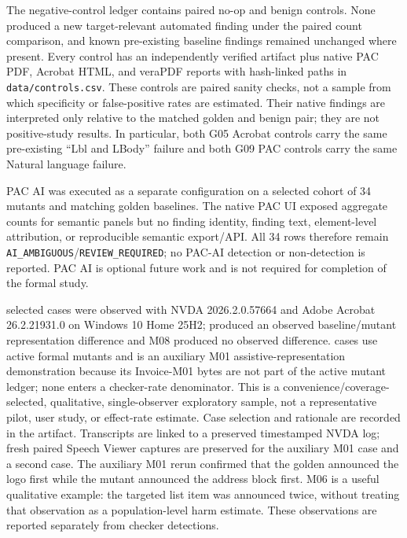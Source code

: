 \documentclass[conference]{IEEEtran}
\newenvironment{taggedparagraph}{%
  \tagstructbegin{tag=P}\tagmcbegin{tag=P}%
}{%
  \tagmcend\tagstructend%
}
\begin{document}
\begin{taggedparagraph}
The negative-control ledger contains \Controls{} paired no-op and benign controls. None produced a new target-relevant automated finding under the paired count comparison, and known pre-existing baseline findings remained unchanged where present. Every control has an independently verified artifact plus native PAC PDF, Acrobat HTML, and veraPDF reports with hash-linked paths in \texttt{data/controls.csv}. These controls are paired sanity checks, not a sample from which specificity or false-positive rates are estimated. Their native findings are interpreted only relative to the matched golden and benign pair; they are not positive-study results. In particular, both G05 Acrobat controls carry the same pre-existing ``Lbl and LBody'' failure and both G09 PAC controls carry the same Natural language failure.
\end{taggedparagraph}

\begin{taggedparagraph}
PAC AI was executed as a separate configuration on a selected cohort of 34 mutants and matching golden baselines. The native PAC UI exposed aggregate counts for semantic panels but no finding identity, finding text, element-level attribution, or reproducible semantic export/API. All 34 rows therefore remain \texttt{AI\_AMBIGUOUS}/\texttt{REVIEW\_REQUIRED}; no PAC-AI detection or non-detection is reported. PAC AI is optional future work and is not required for completion of the formal study.
\end{taggedparagraph}

\begin{taggedparagraph}
\ATCases{} selected cases were observed with NVDA 2026.2.0.57664 and Adobe Acrobat 26.2.21931.0 on Windows 10 Home 25H2; \ATDifferenceCases{} produced an observed baseline/mutant representation difference and M08 produced no observed difference. \FormalATCases{} cases use active formal mutants and \AuxiliaryATCases{} is an auxiliary M01 assistive-representation demonstration because its Invoice-M01 bytes are not part of the active mutant ledger; none enters a checker-rate denominator. This is a convenience/coverage-selected, qualitative, single-observer exploratory sample, not a representative pilot, user study, or effect-rate estimate. Case selection and rationale are recorded in the artifact. Transcripts are linked to a preserved timestamped NVDA log; fresh paired Speech Viewer captures are preserved for the auxiliary M01 case and a second case. The auxiliary M01 rerun confirmed that the golden announced the logo first while the mutant announced the address block first. M06 is a useful qualitative example: the targeted list item was announced twice, without treating that observation as a population-level harm estimate. These observations are reported separately from checker detections.
\end{taggedparagraph}
\end{document}
